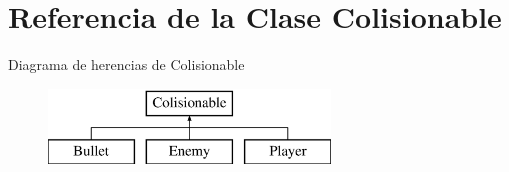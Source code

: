 \hypertarget{classColisionable}{\section{Referencia de la Clase Colisionable}
\label{classColisionable}
}
Diagrama de herencias de Colisionable\begin{figure}[H]
\begin{center}
\leavevmode
\includegraphics[height=2.000000cm]{classColisionable}
\end{center}
\end{figure}
